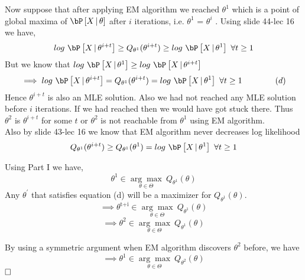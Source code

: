 \documentclass[a4paper,11pt]{article}
\begin{document}
\begin{mlsolution}
Now suppose that after applying EM algorithm we reached $\theta^1$ which is a point of global maxima of $\P{X\cond\theta}$ after $i$ iterations, i.e. $\theta^1$ = $\theta^i$ . Using slide 44-lec 16 we have,
$$log \ \P{X\cond\theta^{i+t}} \geq Q_{\theta^{1}}(\theta^{i+t}) \geq log \ \P{X\cond\theta^1} \ \forall t \geq 1$$
But we know that $log\ \P{X\cond\theta^1} \geq log\ \P{X\cond\theta^{i+t}}$\\
$$\implies log \ \P{X\cond\theta^{i+t}} = Q_{\theta^{1}}(\theta^{i+t}) =log\  \P{X\cond\theta^1} \ \forall t \geq 1  \qquad\qquad{(d)}$$
Hence $\theta^{i+t}$ is also an MLE solution. Also we had not reached any MLE solution before $i$ iterations. If we had reached then we would have got stuck there. Thus $\theta^2$ is $\theta^{i+t}$ for some $t$ or $\theta^2$ is not reachable from $\theta^1$ using EM algorithm. \\
Also by slide 43-lec 16 we know that EM algorithm never decreases log likelihood
$$ Q_{\theta^{1}}(\theta^{i+t}) \geq Q_{\theta^{1}}(\theta^{1}) = log\  \P{X\cond\theta^1} \ \forall t \geq 1 $$

Using Part I we have,
$$\theta^{\text{1}} \in \underset{\theta \in \Theta}{\arg\max}\ Q_{\theta^{\text{1}}}(\theta)$$
Any $\theta^\prime$ that satisfies equation (d) will be a maximizer for $Q_{\theta^{1}}(\theta)$.
$$\implies \theta^{\text{t+i}} \in \underset{\theta \in \Theta}{\arg\max}\ Q_{\theta^{\text{1}}}(\theta)$$
$$\implies \theta^{\text{2}} \in \underset{\theta \in \Theta}{\arg\max}\ Q_{\theta^{\text{1}}}(\theta)$$

By using a symmetric argument when EM algorithm discovers $\theta^2$ before, we have 
$$\implies \theta^{\text{1}} \in \underset{\theta \in \Theta}{\arg\max}\ Q_{\theta^{\text{2}}}(\theta)$$ $\hfill \square$

\end{mlsolution}
\end{document}
